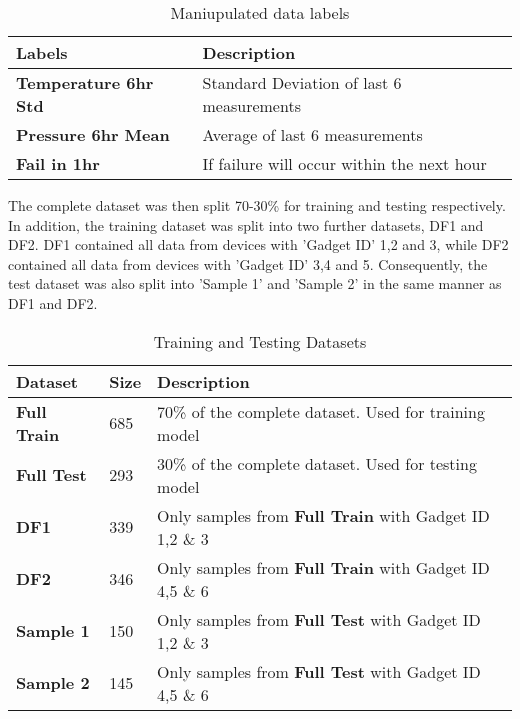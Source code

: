 \begin{table}[H]
    \begin{center}
        \caption{Maniupulated data labels}
        \label{table:labels} 
        \begin{tabular}{ll}
            \toprule
            \textbf{Labels} & \textbf{Description} \\ [0.5ex]
            \midrule
            \textbf{Temperature 6hr Std} & Standard Deviation of last 6 measurements \\
            \textbf{Pressure 6hr Mean} & Average of last 6 measurements \\
            \textbf{Fail in 1hr} & If failure will occur within the next hour \\
            \bottomrule
        \end{tabular}
    \end{center}
\end{table}

The complete dataset was then split 70-30\% for training and testing respectively. 
In addition, the training dataset was split into two further datasets, DF1 and DF2. 
DF1 contained all data from devices with 'Gadget ID' 1,2 and 3, while DF2 contained all data from devices with 'Gadget ID' 3,4 and 5.
Consequently, the test dataset was also split into 'Sample 1' and 'Sample 2' in the same manner as DF1 and DF2.

\begin{table}[H]
    \begin{center}
        \caption{Training and Testing Datasets}
        \label{table:datasets} 
        \begin{tabular}{lll}
            \toprule
            \textbf{Dataset} & \textbf{Size} &\textbf{Description} \\ [0.5ex]
            \midrule
            \textbf{Full Train} &685& 70\% of the complete dataset. Used for training model \\
            \textbf{Full Test}  &293& 30\% of the complete dataset. Used for testing model \\
            \textbf{DF1}        &339& Only samples from \textbf{Full Train} with Gadget ID 1,2 \& 3 \\
            \textbf{DF2}        &346& Only samples from \textbf{Full Train} with Gadget ID 4,5 \& 6 \\
            \textbf{Sample 1}   &150& Only samples from \textbf{Full Test} with Gadget ID 1,2 \& 3 \\
            \textbf{Sample 2}   &145& Only samples from \textbf{Full Test} with Gadget ID 4,5 \& 6 \\
            \bottomrule
        \end{tabular}
    \end{center}
\end{table}

